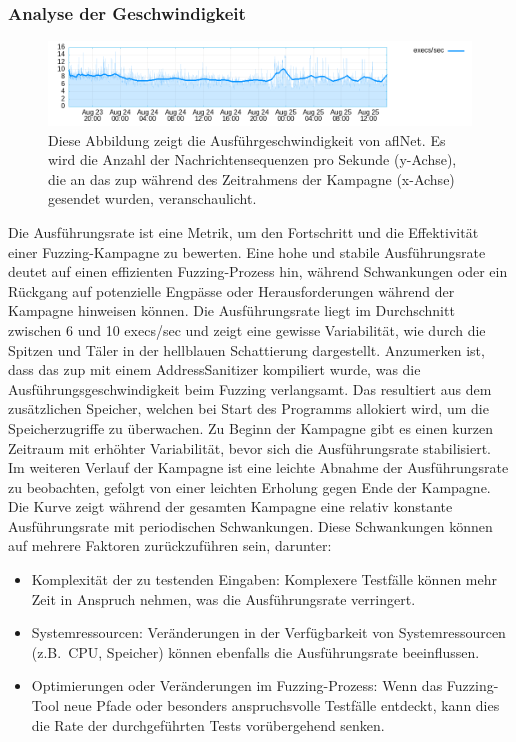 \subsubsection{Analyse der Geschwindigkeit}
\begin{figure}[H]
    \centering
    \includegraphics[width=\textwidth]{img/exec_speed}
    \caption[Diagramm zur Veranschaulichung der Ausführungsgeschwindigkeit von AFLNet während der Fuzzing-Kampagne]{Diese Abbildung zeigt die Ausführgeschwindigkeit von \gls{afl}Net.
    Es wird die Anzahl der Nachrichtensequenzen pro Sekunde (y-Achse), die an das \gls{zup} während des Zeitrahmens der
    Kampagne (x-Achse) gesendet wurden, veranschaulicht.}
    \label{fig:aflnet_execs}
\end{figure}
\noindent Die Ausführungsrate ist eine Metrik, um den Fortschritt und die Effektivität einer Fuzzing-Kampagne zu bewerten.
Eine hohe und stabile Ausführungsrate deutet auf einen effizienten Fuzzing-Prozess hin, während Schwankungen oder ein
Rückgang auf potenzielle Engpässe oder Herausforderungen während der Kampagne hinweisen können.\newline
Die Ausführungsrate liegt im Durchschnitt zwischen 6 und 10 execs/sec und zeigt eine gewisse Variabilität, wie durch die
Spitzen und Täler in der hellblauen Schattierung dargestellt.
Anzumerken ist, dass das \gls{zup} mit einem AddressSanitizer kompiliert wurde, was die Ausführungsgeschwindigkeit
beim Fuzzing verlangsamt.
Das resultiert aus dem zusätzlichen Speicher, welchen bei Start des Programms allokiert wird, um die Speicherzugriffe
zu überwachen.
Zu Beginn der Kampagne gibt es einen kurzen Zeitraum mit erhöhter Variabilität, bevor sich die Ausführungsrate stabilisiert.
Im weiteren Verlauf der Kampagne ist eine leichte Abnahme der Ausführungsrate zu beobachten, gefolgt von einer leichten
Erholung gegen Ende der Kampagne.
Die Kurve zeigt während der gesamten Kampagne eine relativ konstante Ausführungsrate mit periodischen Schwankungen.
Diese Schwankungen können auf mehrere Faktoren zurückzuführen sein, darunter:
\begin{itemize}
    \item Komplexität der zu testenden Eingaben: Komplexere Testfälle können mehr Zeit in Anspruch nehmen, was die Ausführungsrate verringert.
    \item Systemressourcen: Veränderungen in der Verfügbarkeit von Systemressourcen (z.B.\ CPU, Speicher) können ebenfalls die Ausführungsrate beeinflussen.
    \item Optimierungen oder Veränderungen im Fuzzing-Prozess: Wenn das Fuzzing-Tool neue Pfade oder besonders anspruchsvolle Testfälle entdeckt, kann dies die Rate der durchgeführten Tests vorübergehend senken.
\end{itemize}
